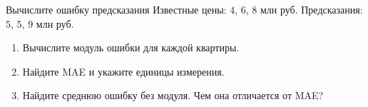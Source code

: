 \begin{frame}{Вычислите ошибку предсказания}
  Известные цены: $4$, $6$, $8$ млн руб. Предсказания: $5$, $5$, $9$ млн руб.
  \begin{enumerate}
    \item Вычислите модуль ошибки для каждой квартиры.
    \item Найдите MAE и укажите единицы измерения.
    \item Найдите среднюю ошибку без модуля. Чем она отличается от MAE?
  \end{enumerate}
\end{frame}
